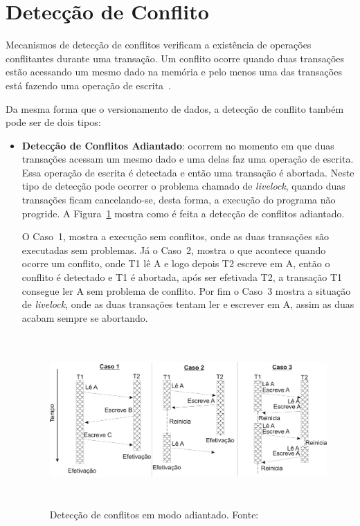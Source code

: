 \documentclass[ti]{texufpel}
\begin{document}
\section{Detecção de Conflito}

Mecanismos de detecção de conflitos verificam a existência de operações conflitantes durante uma transação. Um conflito ocorre quando duas transações estão acessando um mesmo dado na memória e pelo menos uma das transações está fazendo uma operação de escrita~\cite{baldassinTese09}.

Da mesma forma que o versionamento de dados, a detecção de conflito também pode ser de dois tipos:

\begin{itemize}
 \item \textbf{Detecção de Conflitos Adiantado}: ocorrem no momento em que duas transações acessam um mesmo dado e uma delas faz uma operação de escrita. Essa operação de escrita é detectada e então uma transação é abortada. Neste tipo de detecção pode ocorrer o problema chamado de \emph{livelock}, quando duas transações ficam cancelando-se, desta forma, a execução do programa não progride. A Figura~\ref{figuradeteccaoadiantado} mostra como é feita a detecção de conflitos adiantado.

 O Caso~1, mostra a execução sem conflitos, onde as duas transações são executadas sem problemas. Já o Caso~2, mostra o que acontece quando ocorre um conflito, onde T1 lê A e logo depois T2 escreve em A, então o conflito é detectado e T1 é abortada, após ser efetivada T2, a transação T1 consegue ler A sem problema de conflito. Por fim o Caso~3 mostra a situação de \emph{livelock}, onde as duas transações tentam ler e escrever em A, assim as duas acabam sempre se abortando.

\begin{figure}[!htp]
\centering
\includegraphics[height=6.5cm]{Imagens/conflitoadiantado.png}
\caption{Detecção de conflitos em modo adiantado. Fonte:~\cite{rigo07}}
\label{figuradeteccaoadiantado}
\end{figure}


\end{itemize}
\end{document}
